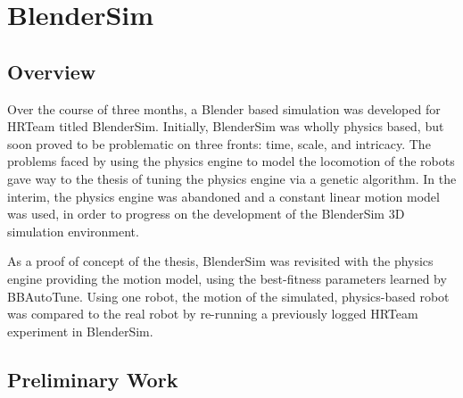 \chapter{BlenderSim}

\label{Chapter5}

\section{Overview}



Over the course of three months, a Blender based simulation was developed for HRTeam titled BlenderSim. Initially, BlenderSim was wholly physics based, but soon proved to be problematic on three fronts: time, scale, and intricacy. The problems faced by using the physics engine to model the locomotion of the robots gave way to the thesis of tuning the physics engine via a genetic algorithm. In the interim, the physics engine was abandoned and a constant linear motion model was used, in order to progress on the development of the BlenderSim 3D simulation environment. 

As a proof of concept of the thesis, BlenderSim was revisited with the physics engine providing the motion model, using the best-fitness parameters learned by BBAutoTune. Using one robot, the motion of the simulated, physics-based robot was compared to the real robot by re-running a previously logged HRTeam experiment in BlenderSim.      



\section{Preliminary Work}

